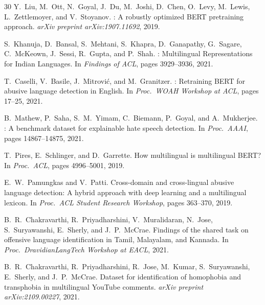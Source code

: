 \documentclass[12pt, a4paper]{article}
\begin{document}
\begin{thebibliography}{30}
Y.~Liu, M.~Ott, N.~Goyal, J.~Du, M.~Joshi, D.~Chen, O.~Levy, M.~Lewis, L.~Zettlemoyer, and V.~Stoyanov.
: A robustly optimized {BERT} pretraining approach.
\newblock \textit{arXiv preprint arXiv:1907.11692}, 2019.

S.~Khanuja, D.~Bansal, S.~Mehtani, S.~Khapra, D.~Ganapathy, G.~Sagare, C.~McKeown, J.~Sessi, R.~Gupta, and P.~Shah.
: Multilingual Representations for Indian Languages.
\newblock In \textit{Findings of ACL}, pages 3929--3936, 2021.

T.~Caselli, V.~Basile, J.~Mitrovi{\'c}, and M.~Granitzer.
: Retraining {BERT} for abusive language detection in English.
\newblock In \textit{Proc.\ WOAH Workshop at ACL}, pages 17--25, 2021.

B.~Mathew, P.~Saha, S.~M.~Yimam, C.~Biemann, P.~Goyal, and A.~Mukherjee.
: A benchmark dataset for explainable hate speech detection.
\newblock In \textit{Proc.\ AAAI}, pages 14867--14875, 2021.

T.~Pires, E.~Schlinger, and D.~Garrette.
\newblock How multilingual is multilingual {BERT}?
\newblock In \textit{Proc.\ ACL}, pages 4996--5001, 2019.

E.~W.~Pamungkas and V.~Patti.
\newblock Cross-domain and cross-lingual abusive language detection: A hybrid approach with deep learning and a multilingual lexicon.
\newblock In \textit{Proc.\ ACL Student Research Workshop}, pages 363--370, 2019.

B.~R.~Chakravarthi, R.~Priyadharshini, V.~Muralidaran, N.~Jose, S.~Suryawanshi, E.~Sherly, and J.~P.~McCrae.
\newblock Findings of the shared task on offensive language identification in Tamil, Malayalam, and Kannada.
\newblock In \textit{Proc.\ DravidianLangTech Workshop at EACL}, 2021.

B.~R.~Chakravarthi, R.~Priyadharshini, R.~Jose, M.~Kumar, S.~Suryawanshi, E.~Sherly, and J.~P.~McCrae.
\newblock Dataset for identification of homophobia and transphobia in multilingual YouTube comments.
\newblock \textit{arXiv preprint arXiv:2109.00227}, 2021.


\end{thebibliography}
\end{document}

